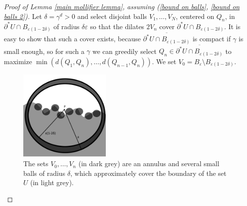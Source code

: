 \begin{proof}[Proof of Lemma \ref{main mollifier lemma}, assuming (\ref{bound on balls}, \ref{bound on balls 2})]
Let $\delta = \gamma^d > 0$ and select disjoint balls $V_1, \dots, V_N$, centered on $Q_n$, in $\partial^* U \cap B_{\varepsilon(1 - 2\delta)}$ of radius $\delta\varepsilon$ so that the dilates $2V_n$ cover $\partial^* U \cap B_{\varepsilon(1 - 2\delta)}$.
It is easy to show that such a cover exists, because $\overline{\partial^* U \cap B_{\varepsilon(1 - 2\delta)}}$ is compact if $\gamma$ is small enough, so for such a $\gamma$ we can greedily select $Q_n \in \overline{\partial^* U \cap B_{\varepsilon(1 - 2\delta)}}$ to maximize $\min(d(Q_1, Q_n), \dots, d(Q_{n - 1}, Q_n))$.
We set $V_0 = B_\varepsilon \setminus B_{\varepsilon(1 - 2\delta)}$.

\begin{figure}[ht]
\caption{The sets $V_0, \dots, V_n$ (in dark grey) are an annulus and several small balls of radius $\delta$, which approximately cover the boundary of the set $U$ (in light grey).}
\includegraphics[width=0.4\textwidth]{covering lemma}
\end{figure}


\end{proof}
